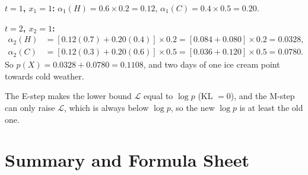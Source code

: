 \documentclass[11pt,a4paper]{article}
\newcommand{\Lb}{\mathcal{L}}
\begin{document}
\begin{example}[Exercise 2: Forward variables in the ice-cream HMM for $X=(1,1)$]
\textbf{$t=1$, $x_1=1$:} $\alpha_1(H)=0.6\times0.2=0.12$, \quad $\alpha_1(C)=0.4\times0.5=0.20$.

\textbf{$t=2$, $x_2=1$:}
\begin{align*}
\alpha_2(H)&=[0.12(0.7)+0.20(0.4)]\times0.2=[0.084+0.080]\times0.2=\mathbf{0.0328},\\
\alpha_2(C)&=[0.12(0.3)+0.20(0.6)]\times0.5=[0.036+0.120]\times0.5=\mathbf{0.0780}.
\end{align*}
So $p(X)=0.0328+0.0780=0.1108$, and two days of one ice cream point towards cold weather.
\end{example}

\begin{example}
The E-step makes the lower bound $\Lb$ equal to $\log p$ (KL $=0$), and the M-step can only raise $\Lb$, which is always below $\log p$, so the new $\log p$ is at least the old one.
\end{example}

\section{Summary and Formula Sheet}
\end{document}
